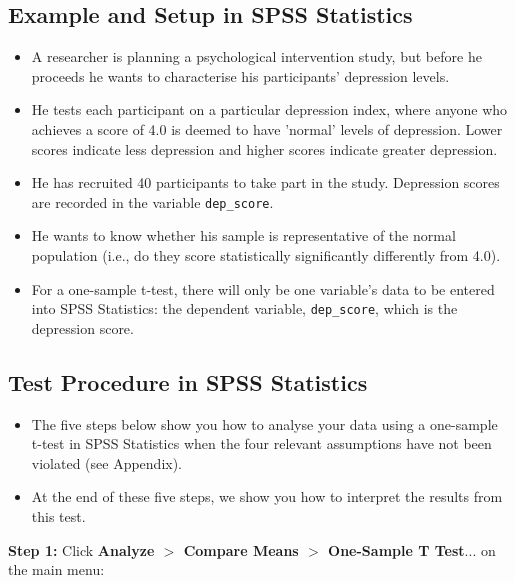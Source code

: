 \documentclass[]{article}
\begin{document}
\subsection{Example and Setup in SPSS Statistics}
\begin{itemize}
	\item A researcher is planning a psychological intervention study, but before he proceeds he wants to characterise his participants' depression levels.
\item He tests each participant on a particular depression index, where anyone who achieves a score of 4.0 is deemed to have 'normal' levels of depression. Lower scores indicate less depression and higher scores indicate greater depression.
\item  He has recruited 40 participants to take part in the study. Depression scores are recorded in the variable \texttt{dep\_score}. 
\item He wants to know whether his sample is representative of the normal population (i.e., do they score statistically significantly differently from 4.0).
	
\item For a one-sample t-test, there will only be one variable's data to be entered into SPSS Statistics: the dependent variable, \texttt{dep\_score}, which is the depression score.
\end{itemize}


\subsection{Test Procedure in SPSS Statistics}
\begin{itemize}
	\item The five steps below show you how to analyse your data using a one-sample t-test in SPSS Statistics when the four relevant assumptions have not been violated (see Appendix). 
	
\item At the end of these five steps, we show you how to interpret the results from this test. 
\end{itemize}


\noindent \textbf{Step 1:} Click \textbf{Analyze $>$ Compare Means $>$ One-Sample T Test}... on the main menu:
\end{document}
